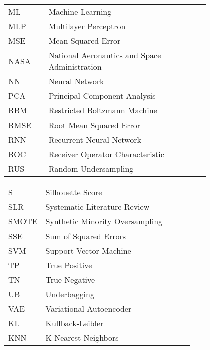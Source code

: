 \begin{flushleft}
\begin{tabular}{l p{0.8\linewidth}}
ML     & Machine Learning\\
MLP & Multilayer Perceptron\\
MSE & Mean Squared Error\\
NASA & National Aeronautics and Space Administration\\
NN      & Neural Network\\
PCA & Principal Component Analysis\\
RBM & Restricted Boltzmann Machine\\
RMSE & Root Mean Squared Error\\
RNN    & Recurrent Neural Network\\
ROC & Receiver Operator Characteristic\\
RUS & Random Undersampling\\
\end{tabular}
\end{flushleft}

\begin{flushleft}
    \begin{tabular}{l p{0.8\linewidth}}
         S & Silhouette Score\\
    SLR    & Systematic Literature Review\\
    SMOTE & Synthetic Minority Oversampling\\
    SSE & Sum of Squared Errors\\
    SVM    & Support Vector Machine\\
    TP  & True Positive\\
    TN  & True Negative\\
    UB & Underbagging\\
    VAE    & Variational Autoencoder\\
    KL    & Kullback-Leibler\\
    KNN    & K-Nearest Neighbors\\
    \end{tabular}
\end{flushleft}



